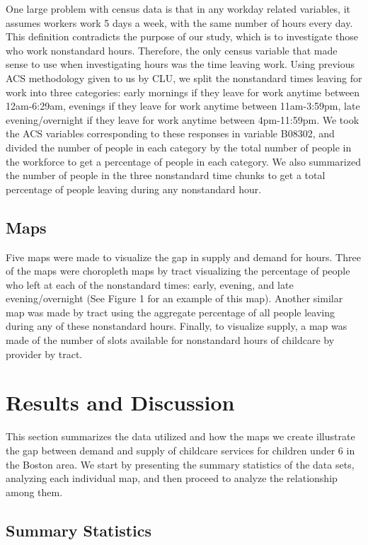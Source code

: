 \documentclass[10pt,letterpaper]{article}
\begin{document}
One large problem with census data is that in any workday related
variables, it assumes workers work 5 days a week, with the same number
of hours every day. This definition contradicts the purpose of our
study, which is to investigate those who work nonstandard hours.
Therefore, the only census variable that made sense to use when
investigating hours was the time leaving work. Using previous ACS
methodology given to us by CLU, we split the nonstandard times leaving
for work into three categories: early mornings if they leave for work
anytime between 12am-6:29am, evenings if they leave for work anytime
between 11am-3:59pm, late evening/overnight if they leave for work
anytime between 4pm-11:59pm. We took the ACS variables corresponding to
these responses in variable B08302, and divided the number of people in
each category by the total number of people in the workforce to get a
percentage of people in each category. We also summarized the number of
people in the three nonstandard time chunks to get a total percentage of
people leaving during any nonstandard hour.

\subsection{Maps}\label{maps-1}

Five maps were made to visualize the gap in supply and demand for hours.
Three of the maps were choropleth maps by tract visualizing the
percentage of people who left at each of the nonstandard times: early,
evening, and late evening/overnight (See Figure 1 for an example of this
map). Another similar map was made by tract using the aggregate
percentage of all people leaving during any of these nonstandard hours.
Finally, to visualize supply, a map was made of the number of slots
available for nonstandard hours of childcare by provider by tract.

\section{Results and Discussion}\label{results-and-discussion}

This section summarizes the data utilized and how the maps we create
illustrate the gap between demand and supply of childcare services for
children under 6 in the Boston area. We start by presenting the summary
statistics of the data sets, analyzing each individual map, and then
proceed to analyze the relationship among them.

\subsection{Summary Statistics}\label{summary-statistics}
\end{document}
